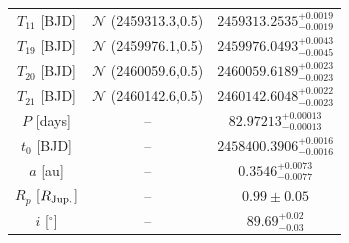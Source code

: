\documentclass[twocolumn,twocolappendix]{aastex631}
\begin{document}
\begin{table}[]
\begin{tabular}{ccc}
$T_{11}$ [BJD]& $\mathcal{N}$ (2459313.3,0.5) & $2459313.2535^{+0.0019}_{-0.0019}$  \\
$T_{19}$ [BJD]& $\mathcal{N}$ (2459976.1,0.5) & $2459976.0493^{+0.0043}_{-0.0045}$  \\
$T_{20}$ [BJD]& $\mathcal{N}$ (2460059.6,0.5) & $2460059.6189^{+0.0023}_{-0.0023}$  \\
$T_{21}$ [BJD]& $\mathcal{N}$ (2460142.6,0.5) & $2460142.6048^{+0.0022}_{-0.0023}$  \\
$P$ [days]               & --                            & $82.97213^{+0.00013}_{-0.00013}$    \\
$t_0$  [BJD]            & --                            & $2458400.3906^{+0.0016}_{-0.0016}$  \\
$a$ [au]               & --                            & $0.3546^{+0.0073}_{-0.0077}$                  \\
$R_p$ [$R_{\rm Jup.}$]   & --                            & $0.99 \pm 0.05$                  \\
$i$ [$^\circ$]   & --                            & $89.69^{+0.02}_{-0.03}$                  \\
\hline
\hline
\end{tabular}
\end{table}
\end{document}
